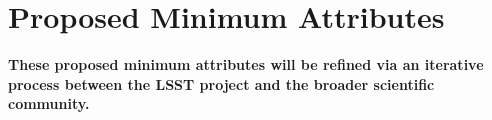 \documentclass[DM,lsstdraft,toc]{lsstdoc}
\begin{document}

\clearpage
\section{Proposed Minimum Attributes}\label{sec:mvp}

\textbf{These proposed minimum attributes will be refined via an iterative process between the LSST project and the broader scientific community.}
\end{document}
